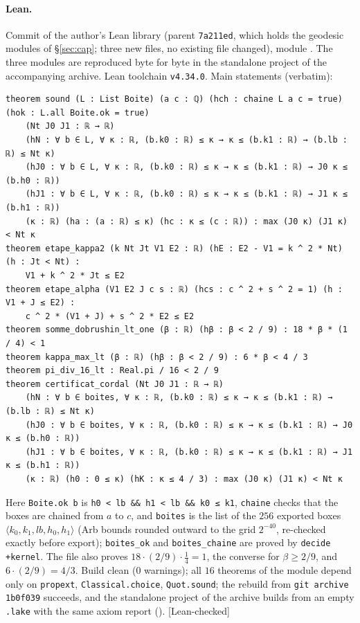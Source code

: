 \documentclass[11pt,a4paper]{article}
\theoremstyle{remark}
\theoremstyle{definition}
\newcommand{\st}[1]{\textsf{[#1]}}
\begin{document}
\paragraph{Lean.} Commit  of the author's Lean library (parent
\texttt{7a211ed}, which holds the geodesic modules of \S\ref{sec:cap}; three new files, no existing file changed),
module . The three modules are reproduced byte for byte in the standalone
project  of the accompanying archive. Lean toolchain \texttt{v4.34.0}. Main statements (verbatim):
{\scriptsize
\begin{verbatim}
theorem sound (L : List Boite) (a c : ℚ) (hch : chaine L a c = true) (hok : L.all Boite.ok = true)
    (Nt J0 J1 : ℝ → ℝ)
    (hN : ∀ b ∈ L, ∀ κ : ℝ, (b.k0 : ℝ) ≤ κ → κ ≤ (b.k1 : ℝ) → (b.lb : ℝ) ≤ Nt κ)
    (hJ0 : ∀ b ∈ L, ∀ κ : ℝ, (b.k0 : ℝ) ≤ κ → κ ≤ (b.k1 : ℝ) → J0 κ ≤ (b.h0 : ℝ))
    (hJ1 : ∀ b ∈ L, ∀ κ : ℝ, (b.k0 : ℝ) ≤ κ → κ ≤ (b.k1 : ℝ) → J1 κ ≤ (b.h1 : ℝ))
    (κ : ℝ) (ha : (a : ℝ) ≤ κ) (hc : κ ≤ (c : ℝ)) : max (J0 κ) (J1 κ) < Nt κ
theorem etape_kappa2 (k Nt Jt V1 E2 : ℝ) (hE : E2 - V1 = k ^ 2 * Nt) (h : Jt < Nt) :
    V1 + k ^ 2 * Jt ≤ E2
theorem etape_alpha (V1 E2 J c s : ℝ) (hcs : c ^ 2 + s ^ 2 = 1) (h : V1 + J ≤ E2) :
    c ^ 2 * (V1 + J) + s ^ 2 * E2 ≤ E2
theorem somme_dobrushin_lt_one (β : ℝ) (hβ : β < 2 / 9) : 18 * β * (1 / 4) < 1
theorem kappa_max_lt (β : ℝ) (hβ : β < 2 / 9) : 6 * β < 4 / 3
theorem pi_div_16_lt : Real.pi / 16 < 2 / 9
theorem certificat_cordal (Nt J0 J1 : ℝ → ℝ)
    (hN : ∀ b ∈ boites, ∀ κ : ℝ, (b.k0 : ℝ) ≤ κ → κ ≤ (b.k1 : ℝ) → (b.lb : ℝ) ≤ Nt κ)
    (hJ0 : ∀ b ∈ boites, ∀ κ : ℝ, (b.k0 : ℝ) ≤ κ → κ ≤ (b.k1 : ℝ) → J0 κ ≤ (b.h0 : ℝ))
    (hJ1 : ∀ b ∈ boites, ∀ κ : ℝ, (b.k0 : ℝ) ≤ κ → κ ≤ (b.k1 : ℝ) → J1 κ ≤ (b.h1 : ℝ))
    (κ : ℝ) (h0 : 0 ≤ κ) (hK : κ ≤ 4 / 3) : max (J0 κ) (J1 κ) < Nt κ
\end{verbatim}}
Here \texttt{Boite.ok b} is \texttt{h0 < lb \&\& h1 < lb \&\& k0 ≤ k1}, \texttt{chaine} checks that the boxes are
chained from $a$ to $c$, and \texttt{boites} is the list of the $256$ exported boxes $\langle k_0,k_1,lb,h_0,h_1\rangle$
(Arb bounds rounded outward to the grid $2^{-40}$, re-checked exactly before export); \texttt{boites\_ok} and
\texttt{boites\_chaine} are proved by \texttt{decide +kernel}. The file also proves $18\cdot(2/9)\cdot\frac14=1$, the
converse for $\beta\ge2/9$, and $6\cdot(2/9)=4/3$. Build clean (0 warnings); all $16$ theorems of the module depend
only on \texttt{propext}, \texttt{Classical.choice}, \texttt{Quot.sound}; the rebuild from \texttt{git archive 1b0f039}
succeeds, and the standalone project  of the archive builds from an empty \texttt{.lake} with the same
axiom report (). \st{Lean-checked}
\end{document}
